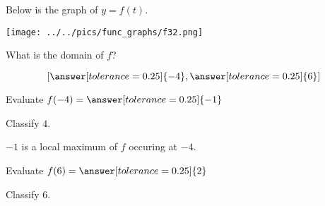 \documentclass{ximera}
\author{Lee Wayand}
\begin{document}
\begin{exercise}  





Below is the graph of $y=f(t)$.  

\begin{image}
\texttt{[image: ../../pics/func\_graphs/f32.png]}
\end{image}


\begin{question} 

What is the domain of $f$?


\[
\left[ \answer[tolerance=0.25]{-4}, \answer[tolerance=0.25]{6} \right]
\]

\end{question}





\begin{question} 



Evaluate $f(-4) = \answer[tolerance=0.25]{-1}$


Classify $4$. \\


\begin{multipleChoice}
\end{multipleChoice}




$-1$ is a local maximum of $f$ occuring at $-4$. \\


\begin{multipleChoice}
\end{multipleChoice}


\end{question}








\begin{question} 



Evaluate $f(6) = \answer[tolerance=0.25]{2}$


Classify $6$. \\


\begin{multipleChoice}
\end{multipleChoice}





\end{question}
\end{exercise}
\end{document}
